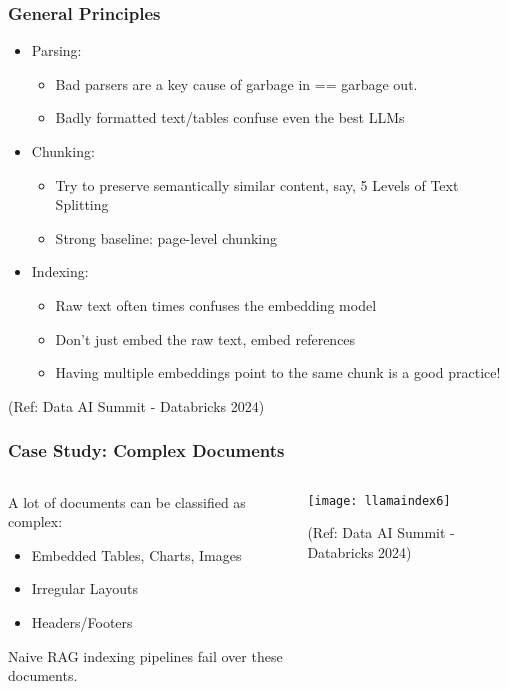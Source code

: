 \begin{frame}[fragile]\frametitle{General Principles}


\begin{itemize}
\item Parsing:
	\begin{itemize}
	\item Bad parsers are a key cause of garbage in == garbage out.
	\item Badly formatted text/tables confuse even the best LLMs
	\end{itemize}	
\item Chunking: 
	\begin{itemize}
	\item Try to preserve semantically similar content, say, 5 Levels of Text Splitting
	\item Strong baseline: page-level chunking
	\end{itemize}	
\item Indexing:
	\begin{itemize}
	\item Raw text often times confuses the embedding model
	\item Don’t just embed the raw text, embed references
	\item Having multiple embeddings point to the same chunk is a good practice! 
	\end{itemize}		
\end{itemize}	

{\tiny (Ref: Data AI Summit - Databricks 2024)}

\end{frame}

\begin{frame}[fragile]\frametitle{Case Study: Complex Documents}

\begin{columns}
    \begin{column}[T]{0.4\linewidth}
	A lot of documents can be classified as complex: 

		\begin{itemize}
		\item Embedded Tables, Charts, Images
		\item Irregular Layouts
		\item Headers/Footers
		\end{itemize}	
Naive RAG indexing pipelines fail over these documents.
		
    \end{column}
    \begin{column}[T]{0.6\linewidth}
		\begin{center}
		\texttt{[image: llamaindex6]}

		{\tiny (Ref: Data AI Summit - Databricks 2024)}  
		\end{center}
    \end{column}
  \end{columns}
  
\end{frame}


